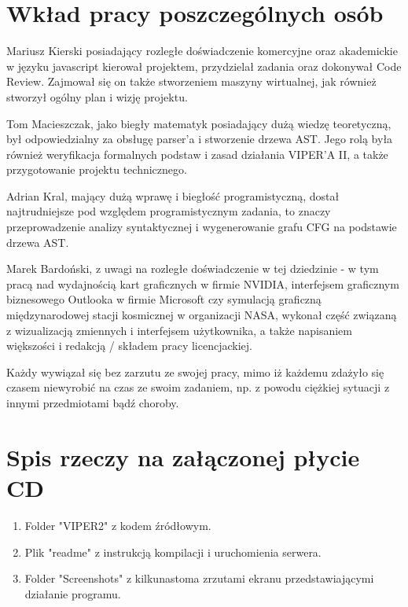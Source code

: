 \documentclass[a4paper,twoside,openright,11pt]{report}
\begin{document}
  \chapter {Wkład pracy poszczególnych osób}
\par Mariusz Kierski posiadający rozległe doświadczenie komercyjne oraz akademickie w języku javascript kierował projektem, przydzielał zadania oraz dokonywał Code Review. Zajmował się on także stworzeniem maszyny wirtualnej, jak również stworzył ogólny plan i wizję projektu.
\par Tom Macieszczak, jako biegły matematyk posiadający dużą wiedzę teoretyczną, był odpowiedzialny za obsługę parser'a i stworzenie drzewa AST. Jego rolą była również weryfikacja formalnych podstaw i zasad działania VIPER'A II, a także przygotowanie projektu technicznego.
\par Adrian Kral, mający dużą wprawę i biegłość programistyczną, dostał najtrudniejsze pod względem programistycznym zadania, to znaczy przeprowadzenie analizy syntaktycznej i wygenerowanie grafu CFG na podstawie drzewa AST.  
\par Marek Bardoński, z uwagi na rozległe doświadczenie w tej dziedzinie - w tym pracą nad wydajnością kart graficznych w firmie NVIDIA, interfejsem graficznym biznesowego Outlooka w firmie Microsoft czy symulacją graficzną międzynarodowej stacji kosmicznej w organizacji NASA, wykonał część związaną z wizualizacją zmiennych i interfejsem użytkownika, a także napisaniem większości i redakcją / składem pracy licencjackiej.
\par Każdy wywiązał się bez zarzutu ze swojej pracy, mimo iż każdemu zdażyło się czasem niewyrobić na czas ze swoim zadaniem, np. z powodu ciężkiej sytuacji z innymi przedmiotami bądź choroby.

  \chapter {Spis rzeczy na załączonej płycie CD}
  \begin {enumerate}
    \item Folder "VIPER2" z kodem źródłowym.
    \item Plik "readme" z instrukcją kompilacji i uruchomienia serwera.
    \item Folder "Screenshots" z kilkunastoma zrzutami ekranu przedstawiającymi działanie programu.
  \end {enumerate}
  
\end{document}

